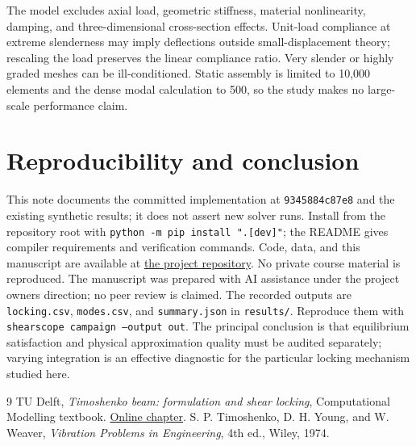 \documentclass[10pt,a4paper]{article}
\begin{document}
The model excludes axial load, geometric stiffness, material nonlinearity, damping, and three-dimensional cross-section effects. Unit-load compliance at extreme slenderness may imply deflections outside small-displacement theory; rescaling the load preserves the linear compliance ratio. Very slender or highly graded meshes can be ill-conditioned. Static assembly is limited to 10,000 elements and the dense modal calculation to 500, so the study makes no large-scale performance claim.
\section{Reproducibility and conclusion}
This note documents the committed implementation at \texttt{9345884c87e8} and the existing synthetic results; it does not assert new solver runs. Install from the repository root with \texttt{python -m pip install ".[dev]"}; the README gives compiler requirements and verification commands. Code, data, and this manuscript are available at \href{https://github.com/racostacme-come/shearscope}{the project repository}. No private course material is reproduced. The manuscript was prepared with AI assistance under the project owner\textquotesingle s direction; no peer review is claimed.
The recorded outputs are \texttt{locking.csv}, \texttt{modes.csv}, and \texttt{summary.json} in \texttt{results/}. Reproduce them with \texttt{shearscope campaign --output out}. The principal conclusion is that equilibrium satisfaction and physical approximation quality must be audited separately; varying integration is an effective diagnostic for the particular locking mechanism studied here.
\begin{thebibliography}{9}
 TU Delft, \emph{Timoshenko beam: formulation and shear locking}, Computational Modelling textbook. \href{https://teachbooks.tudelft.nl/computational-modelling/structural_linear/timoshenko.html}{Online chapter}.
 S. P. Timoshenko, D. H. Young, and W. Weaver, \emph{Vibration Problems in Engineering}, 4th ed., Wiley, 1974.
\end{thebibliography}
\end{document}

